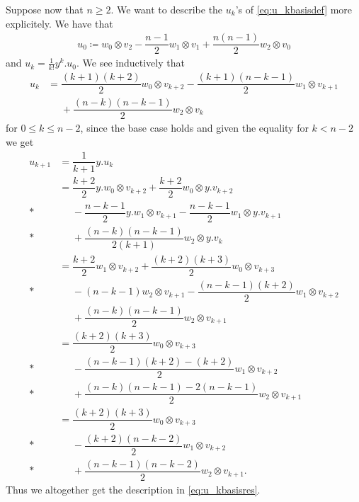Suppose now that $n\geq 2$. We want to describe the $u_k$'s of \cref{eq:u_kbasisdef} more explicitely. We have that
\begin{align*}
  u_0 \coloneqq w_0\otimes v_2 - \dfrac{n-1}{2}w_1\otimes v_1 + \dfrac{n(n-1)}{2}w_2\otimes v_0
\end{align*}
and $u_k=\tfrac{1}{k!}y^k . u_0$. We see inductively that
\begin{align*}
  u_k &= \dfrac{(k+1)(k+2)}{2}w_0\otimes v_{k+2} - \dfrac{(k+1)(n-k-1)}{2}w_1\otimes v_{k+1} \\
  &\phantom{{}={}}{} + \dfrac{(n-k)(n-k-1)}{2}w_2\otimes v_k
\end{align*}
for $0\leq k\leq n-2$, since the base case holds and given the equality for $k<n-2$ we get
\begin{align*}
  u_{k+1} &= \dfrac{1}{k+1}y.u_k \\
          &= \dfrac{k+2}{2}y.w_0\otimes v_{k+2} + \dfrac{k+2}{2}w_0\otimes y.v_{k+2} \\*
          &\phantom{{}={}}{} - \dfrac{n-k-1}{2}y.w_1\otimes v_{k+1} - \dfrac{n-k-1}{2}w_1\otimes y.v_{k+1} \\*
          &\phantom{{}={}}{} + \dfrac{(n-k)(n-k-1)}{2(k+1)}w_2\otimes y.v_k \\
          &= \dfrac{k+2}{2}w_1\otimes v_{k+2} + \dfrac{(k+2)(k+3)}{2}w_0\otimes v_{k+3} \\*
          &\phantom{{}={}}{} - (n-k-1)w_2\otimes v_{k+1} - \dfrac{(n-k-1)(k+2)}{2}w_1\otimes v_{k+2} \\
          &\phantom{{}={}}{} + \dfrac{(n-k)(n-k-1)}{2}w_2\otimes v_{k+1} \\
          &= \dfrac{(k+2)(k+3)}{2}w_0\otimes v_{k+3} \\*
          &\phantom{{}={}}{} - \dfrac{(n-k-1)(k+2)-(k+2)}{2}w_1\otimes v_{k+2} \\*
          &\phantom{{}={}}{} + \dfrac{(n-k)(n-k-1)-2(n-k-1)}{2}w_2\otimes v_{k+1} \\
          &= \dfrac{(k+2)(k+3)}{2}w_0\otimes v_{k+3} \\*
          &\phantom{{}={}}{} - \dfrac{(k+2)(n-k-2)}{2}w_1\otimes v_{k+2} \\*
          &\phantom{{}={}}{} + \dfrac{(n-k-1)(n-k-2)}{2}w_2\otimes v_{k+1}.
\end{align*}
Thus we altogether get the description in \cref{eq:u_kbasisres}.

